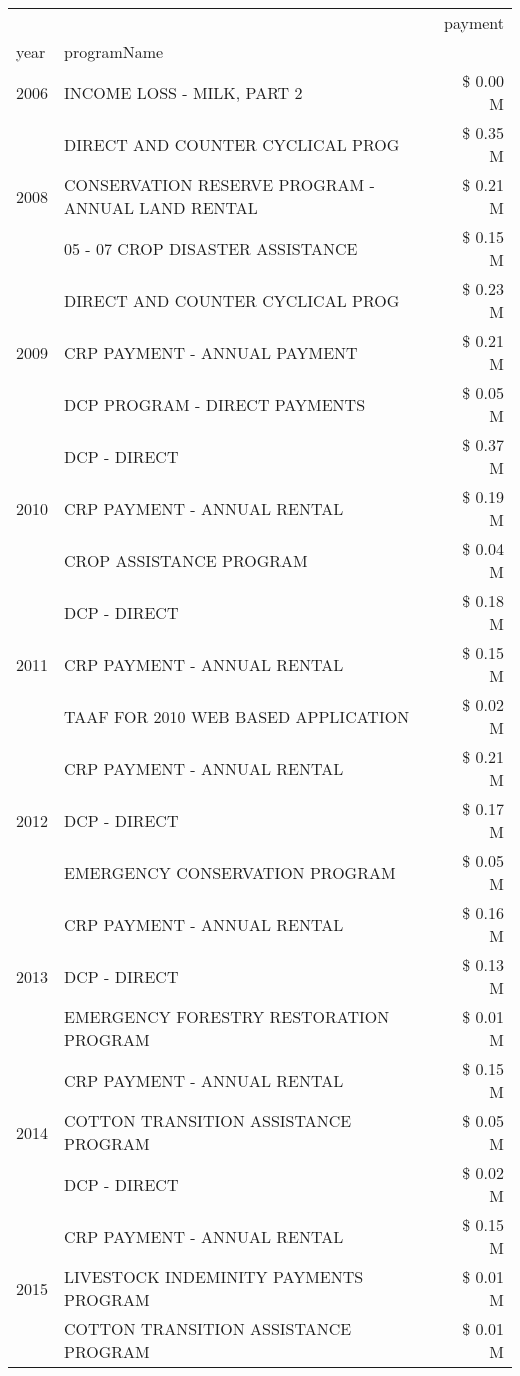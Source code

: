 \begin{tabular}{llr}
\toprule
 &  & payment \\
year & programName &  \\
\midrule
2006 & INCOME LOSS - MILK, PART 2 & \$ 0.00 M \\
\cline{1-3}
\multirow[t]{3}{*}{2008} & DIRECT AND COUNTER CYCLICAL PROG & \$ 0.35 M \\
 & CONSERVATION RESERVE PROGRAM - ANNUAL LAND RENTAL & \$ 0.21 M \\
 & 05 - 07 CROP DISASTER ASSISTANCE & \$ 0.15 M \\
\cline{1-3}
\multirow[t]{3}{*}{2009} & DIRECT AND COUNTER CYCLICAL PROG & \$ 0.23 M \\
 & CRP PAYMENT - ANNUAL PAYMENT & \$ 0.21 M \\
 & DCP PROGRAM - DIRECT PAYMENTS & \$ 0.05 M \\
\cline{1-3}
\multirow[t]{3}{*}{2010} & DCP - DIRECT & \$ 0.37 M \\
 & CRP PAYMENT - ANNUAL RENTAL & \$ 0.19 M \\
 & CROP ASSISTANCE PROGRAM & \$ 0.04 M \\
\cline{1-3}
\multirow[t]{3}{*}{2011} & DCP - DIRECT & \$ 0.18 M \\
 & CRP PAYMENT - ANNUAL RENTAL & \$ 0.15 M \\
 & TAAF FOR 2010 WEB BASED APPLICATION & \$ 0.02 M \\
\cline{1-3}
\multirow[t]{3}{*}{2012} & CRP PAYMENT - ANNUAL RENTAL & \$ 0.21 M \\
 & DCP - DIRECT & \$ 0.17 M \\
 & EMERGENCY CONSERVATION PROGRAM & \$ 0.05 M \\
\cline{1-3}
\multirow[t]{3}{*}{2013} & CRP PAYMENT - ANNUAL RENTAL & \$ 0.16 M \\
 & DCP - DIRECT & \$ 0.13 M \\
 & EMERGENCY FORESTRY RESTORATION PROGRAM & \$ 0.01 M \\
\cline{1-3}
\multirow[t]{3}{*}{2014} & CRP PAYMENT - ANNUAL RENTAL & \$ 0.15 M \\
 & COTTON TRANSITION ASSISTANCE PROGRAM & \$ 0.05 M \\
 & DCP - DIRECT & \$ 0.02 M \\
\cline{1-3}
\multirow[t]{3}{*}{2015} & CRP PAYMENT - ANNUAL RENTAL & \$ 0.15 M \\
 & LIVESTOCK INDEMINITY PAYMENTS PROGRAM & \$ 0.01 M \\
 & COTTON TRANSITION ASSISTANCE PROGRAM & \$ 0.01 M \\

\end{tabular}
